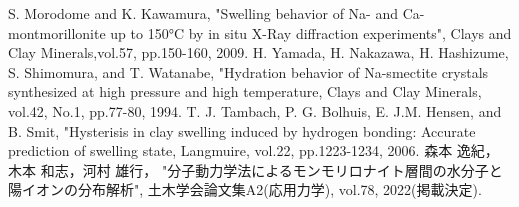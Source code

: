 ﻿\documentclass[11pt,a4j]{jarticle}
\begin{document}
\begin{thebibliography}{99}
	S. Morodome and K. Kawamura, 
	"Swelling behavior of Na- and Ca-montmorillonite up to 150°C by 
	in situ X-Ray diffraction experiments", 
	Clays and Clay Minerals,vol.57, pp.150-160, 2009.
	H. Yamada, H. Nakazawa, H. Hashizume, S. Shimomura, and T. Watanabe, 
	"Hydration behavior of Na-smectite crystals synthesized at high pressure 
	and high temperature, Clays and Clay Minerals, vol.42, No.1, pp.77-80, 1994.
	T. J. Tambach, P. G. Bolhuis, E. J.M. Hensen, and B. Smit, 
	"Hysterisis in clay swelling induced by hydrogen bonding: 
		Accurate prediction of swelling state, Langmuire, 
	vol.22, pp.1223-1234, 2006.
	森本 逸紀，木本 和志，河村 雄行，
	"分子動力学法によるモンモリロナイト層間の水分子と陽イオンの分布解析", 
		土木学会論文集A2(応用力学), vol.78, 2022(掲載決定). 	
\end{thebibliography}
\end{document}
